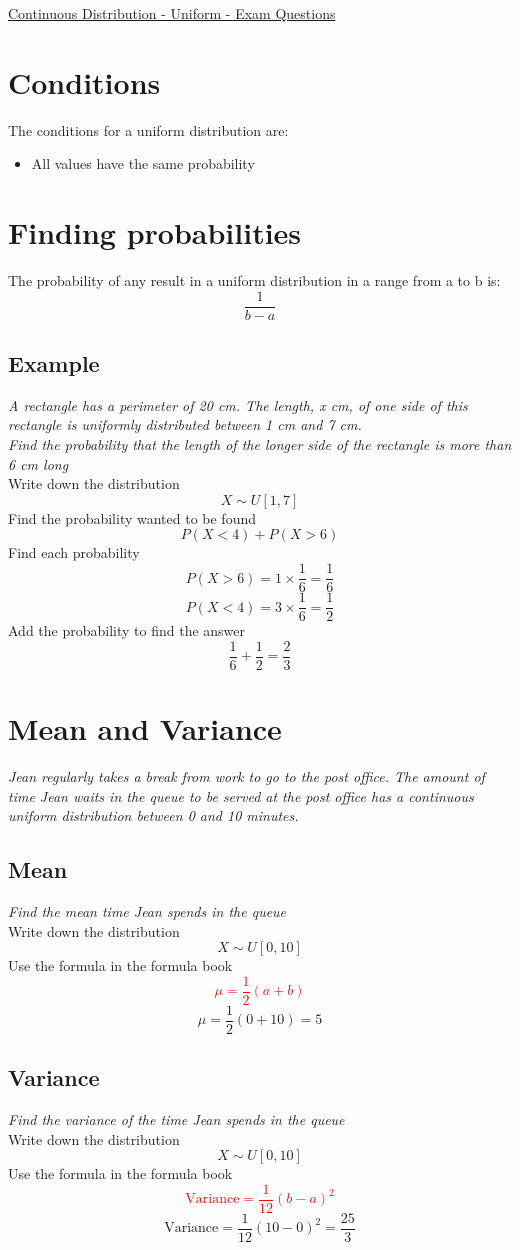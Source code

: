 \documentclass{article}[18pt]
\begin{document}
\begin{center}
\underline{\huge Continuous Distribution - Uniform - Exam Questions}
\end{center}
\section{Conditions}
The conditions for a uniform distribution are:
\begin{itemize}
\item All values have the same probability
\end{itemize}
\section{Finding probabilities}
The probability of any result in a uniform distribution in a range from a to b is:
$$\frac{1}{b-a}$$
\subsection{Example}
\textit{A rectangle has a perimeter of 20 cm. The length, x cm, of one side of this rectangle is
uniformly distributed between 1 cm and 7 cm.\\
Find the probability that the length of the longer side of the rectangle is more than 6 cm long}\\
Write down the distribution
$$X\sim U[1,7]$$
Find the probability wanted to be found
$$P(X<4)+P(X>6)$$
Find each probability
$$P(X>6)=1\times\frac{1}{6}=\frac{1}{6}$$
$$P(X<4)=3\times\frac{1}{6}=\frac{1}{2}$$
Add the probability to find the answer
$$\frac{1}{6}+\frac{1}{2}=\frac{2}{3}$$
\section{Mean and Variance}
\textit{Jean regularly takes a break from work to go to the post office. The amount of time Jean waits
in the queue to be served at the post office has a continuous uniform distribution between 0 and
10 minutes.}
\subsection{Mean}
\textit{Find the mean time Jean spends in the queue}\\
Write down the distribution
$$X\sim U[0,10]$$
Use the formula in the formula book
\textcolor{red}{$$\mu=\frac{1}{2}(a+b)$$}
$$\mu=\frac{1}{2}(0+10)=5$$
\subsection{Variance}
\textit{Find the variance of the time Jean spends in the queue}\\
Write down the distribution
$$X\sim U[0,10]$$
Use the formula in the formula book
\textcolor{red}{$$\textrm{Variance}=\frac{1}{12}(b-a)^2$$}
$$\textrm{Variance}=\frac{1}{12}(10-0)^2=\frac{25}{3}$$
\end{document}
